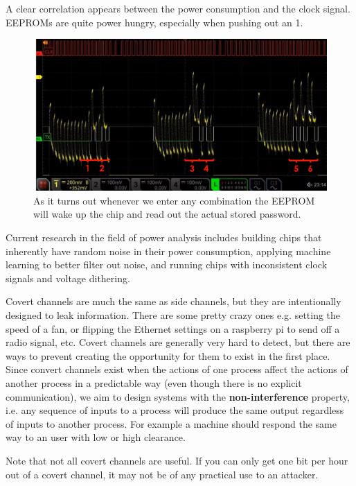 \documentclass[../notes.tex]{subfiles}
\begin{document}
A clear correlation appears between the power consumption and the clock signal. EEPROMs are quite power hungry, especially when pushing out an 1. 

\begin{figure}[H]
    \centering
    \includegraphics[width=0.8\linewidth]{img/image_2023-03-28-15-53-12.png}
    \caption{As it turns out whenever we enter any combination the EEPROM will wake up the chip and read out the actual stored password.}
\end{figure}


Current research in the field of power analysis includes building chips that inherently have random noise in their power consumption, applying machine learning to better filter out noise, and running chips with inconsistent clock signals and voltage dithering.


\begin{definition}
    Covert channels are much the same as side channels, but they are intentionally designed to leak information.
    There are some pretty crazy ones e.g. setting the speed of a fan, or flipping the Ethernet settings on a raspberry pi to send off a radio signal, etc.
    Covert channels are generally very hard to detect, but there are ways to prevent creating the opportunity for them to exist in the first place.
    Since convert channels exist when the actions of one process affect the actions of another process in a predictable way (even though there is no explicit communication), we aim to design systems with the \textbf{non-interference} property, i.e. any sequence of inputs to a process will produce the same output regardless of inputs to another process.
    For example a machine should respond the same way to an user with low or high clearance.
\end{definition}

Note that not all covert channels are useful. If you can only get one bit per hour out of a covert channel, it may not be of any practical use to an attacker.
\end{document}
